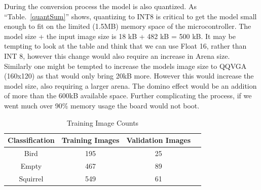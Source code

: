 \documentclass[conference]{IEEEtran}
\begin{document}
During the conversion process the model is also quantized. As ``Table.~\ref{quantSum}'' shows, quantizing to INT8 is critical to get the model small enough to fit on the limited (1.5MB) memory space of the microcontroller.
The model size + the input image size is 18 kB + 482 kB = 500 kB. It may be tempting to look at the table and think that we can use Float 16, rather than INT 8, however this change would also require an increase in Arena size. Similarly one might be tempted to increase the models image size to QQVGA (160x120) as that would only bring 20kB more. However this would increase the model size, also requiring a larger arena. The domino effect would be an addition of more than the 600kB available space. Further complicating the process, if we went much  over  90\% memory usage the board would not boot. 

\begin{table}[htbp]
\caption{Training Image Counts}
\begin{center}
\begin{tabular}{|c|c|c|c|}
\hline
\textbf{Classification} & \textbf{Training Images}   & \textbf{Validation Images} \\ \hline 
	Bird& 195 & 25\\ \hline 
	Empty& 467 & 89\\ \hline 
	Squirrel& 549 & 61\\ \hline 
\end{tabular}
\label{numImages}
\end{center}
\end{table}
\end{document}
